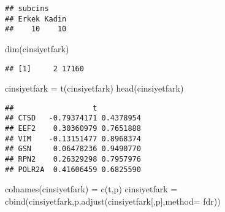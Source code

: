 \documentclass[
]{book}
\newenvironment{Shaded}{\begin{snugshade}}{\end{snugshade}}
\newcommand{\AttributeTok}[1]{\textcolor[rgb]{0.77,0.63,0.00}{#1}}
\newcommand{\ControlFlowTok}[1]{\textcolor[rgb]{0.13,0.29,0.53}{\textbf{#1}}}
\newcommand{\DecValTok}[1]{\textcolor[rgb]{0.00,0.00,0.81}{#1}}
\newcommand{\FunctionTok}[1]{\textcolor[rgb]{0.00,0.00,0.00}{#1}}
\newcommand{\NormalTok}[1]{#1}
\newcommand{\OtherTok}[1]{\textcolor[rgb]{0.56,0.35,0.01}{#1}}
\newcommand{\SpecialCharTok}[1]{\textcolor[rgb]{0.00,0.00,0.00}{#1}}
\newcommand{\StringTok}[1]{\textcolor[rgb]{0.31,0.60,0.02}{#1}}
\begin{document}
\begin{verbatim}
## subcins
## Erkek Kadin 
##    10    10
\end{verbatim}

\begin{Shaded}
\end{Shaded}

\begin{Shaded}
\begin{Highlighting}[]
\FunctionTok{dim}\NormalTok{(cinsiyetfark)}
\end{Highlighting}
\end{Shaded}

\begin{verbatim}
## [1]     2 17160
\end{verbatim}

\begin{Shaded}
\begin{Highlighting}[]
\NormalTok{cinsiyetfark }\OtherTok{=} \FunctionTok{t}\NormalTok{(cinsiyetfark)}
\FunctionTok{head}\NormalTok{(cinsiyetfark)}
\end{Highlighting}
\end{Shaded}

\begin{verbatim}
##                  t          
## CTSD   -0.79374171 0.4378954
## EEF2    0.30360979 0.7651888
## VIM    -0.13151477 0.8968374
## GSN     0.06478236 0.9490770
## RPN2    0.26329298 0.7957976
## POLR2A  0.41606459 0.6825590
\end{verbatim}

\begin{Shaded}
\begin{Highlighting}[]
\FunctionTok{colnames}\NormalTok{(cinsiyetfark) }\OtherTok{=} \FunctionTok{c}\NormalTok{(}\StringTok{\textquotesingle{}t\textquotesingle{}}\NormalTok{,}\StringTok{\textquotesingle{}p\textquotesingle{}}\NormalTok{)}
\NormalTok{cinsiyetfark }\OtherTok{=} \FunctionTok{cbind}\NormalTok{(cinsiyetfark,}\FunctionTok{p.adjust}\NormalTok{(cinsiyetfark[,}\StringTok{\textquotesingle{}p\textquotesingle{}}\NormalTok{],}\AttributeTok{method=} \StringTok{\textquotesingle{}fdr\textquotesingle{}}\NormalTok{))}
\end{Highlighting}
\end{Shaded}
\end{document}
